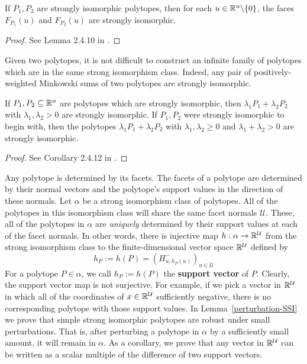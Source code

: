 \documentclass{puthesis-UG}
\begin{document}
\begin{lem} \label{family-of-strongly-isomorphic}
	If $P_1, P_2$ are strongly isomorphic polytopes, then for each $u \in \mathbb{R}^n \backslash \{0\}$, the faces $F_{P_1}(u)$ and $F_{P_2}(u)$ are strongly isomorphic. 
\end{lem}
\begin{proof}
	See Lemma 2.4.10 in \cite{schneider_2013}. 
\end{proof}

Given two polytopes, it is not difficult to construct an infinite family of polytopes which are in the same strong isomorphism class. Indeed, any pair of positively-weighted Minkowski sums of two polytopes are strongly isomorphic. 

\begin{prop} \label{families-of-strongly-isomorphic}
	If $P_1, P_2 \subseteq \mathbb{R}^n$ are polytopes which are strongly isomorphic, then $\lambda_1 P_1 + \lambda_2 P_2$ with $\lambda_1, \lambda_2 > 0$ are strongly isomorphic. If $P_1, P_2$ were strongly isomorphic to begin with, then the polytopes $\lambda_1 P_1 + \lambda_2 P_2$ with $\lambda_1, \lambda_2 \geq 0$ and $\lambda_1 + \lambda_2 > 0$ are strongly isomorphic. 
\end{prop}

\begin{proof}
	See Corollary 2.4.12 in \cite{schneider_2013}.
\end{proof}

Any polytope is determined by its facets. The facets of a polytope are determined by their normal vectors and the polytope's support values in the direction of these normals. Let $\alpha$ be a strong isomorphism class of polytopes. All of the polytopes in this isomorphism class will share the same facet normals $\mathcal{U}$. These, all of the polytopes in $\alpha$ are \textit{uniquely} determined by their support values at each of the facet normals. In other words, there is injective map $h : \alpha \to \mathbb{R}^\mathcal{U}$ from the strong isomorphism class to the finite-dimensional vector space $\mathbb{R}^{\mathcal{U}}$ defined by 
\[
	h_P := h(P) = \left ( H^-_{u, h_P(u)}\right )_{u \in \mathcal{U}}
\]
For a polytope $P \in \alpha$, we call $h_P := h(P)$ the \textbf{support vector} of $P$. Clearly, the support vector map is not surjective. For example, if we pick a vector in $\mathbb{R}^\mathcal{U}$ in which all of the coordinates of $x \in \mathbb{R}^{\mathcal{U}}$ sufficiently negative, there is no corresponding polytope with those support values. In Lemma~\ref{perturbation-SSI} we prove that simple strong isomorphic polytopes are robust under small perturbations. That is, after perturbing a polytope in $\alpha$ by a sufficiently small amount, it will remain in $\alpha$. As a corollary, we prove that any vector in $\mathbb{R}^{\mathcal{U}}$ can be written as a scalar multiple of the difference of two support vectors. 
\end{document}
